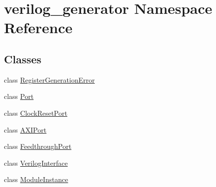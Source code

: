\hypertarget{namespaceverilog__generator}{\section{verilog\-\_\-generator Namespace Reference}
\label{namespaceverilog__generator}
}
\subsection*{Classes}
\begin{DoxyCompactItemize}
\item 
class \hyperlink{classverilog__generator_1_1RegisterGenerationError}{Register\-Generation\-Error}
\item 
class \hyperlink{classverilog__generator_1_1Port}{Port}
\item 
class \hyperlink{classverilog__generator_1_1ClockResetPort}{Clock\-Reset\-Port}
\item 
class \hyperlink{classverilog__generator_1_1AXIPort}{A\-X\-I\-Port}
\item 
class \hyperlink{classverilog__generator_1_1FeedthroughPort}{Feedthrough\-Port}
\item 
class \hyperlink{classverilog__generator_1_1VerilogInterface}{Verilog\-Interface}
\item 
class \hyperlink{classverilog__generator_1_1ModuleInstance}{Module\-Instance}
\end{DoxyCompactItemize}
